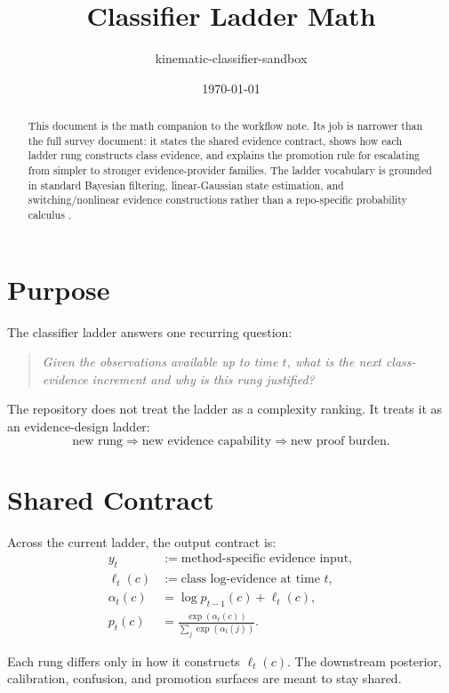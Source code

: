 \documentclass[11pt]{article}
\title{Classifier Ladder Math}
\author{kinematic-classifier-sandbox}
\date{\today}
\begin{document}
\maketitle

\begin{abstract}
This document is the math companion to the workflow note. Its job is narrower than the full survey document: it states the shared evidence contract, shows how each ladder rung constructs class evidence, and explains the promotion rule for escalating from simpler to stronger evidence-provider families. The ladder vocabulary is grounded in standard Bayesian filtering, linear-Gaussian state estimation, and switching/nonlinear evidence constructions rather than a repo-specific probability calculus \cite{kalman1960,barshalom2001,gordon1993,doucet2001}.
\end{abstract}

\section{Purpose}
The classifier ladder answers one recurring question:
\begin{quote}
\textit{Given the observations available up to time \(t\), what is the next class-evidence increment and why is this rung justified?}
\end{quote}

The repository does not treat the ladder as a complexity ranking. It treats it as an evidence-design ladder:
\begin{equation}
\text{new rung} \Longrightarrow \text{new evidence capability} \Longrightarrow \text{new proof burden}.
\end{equation}

\section{Shared Contract}
Across the current ladder, the output contract is:
\begin{align}
y_t &:= \text{method-specific evidence input}, \\
\ell_t(c) &:= \text{class log-evidence at time } t, \\
\alpha_t(c) &= \log p_{t-1}(c) + \ell_t(c), \\
p_t(c) &= \frac{\exp(\alpha_t(c))}{\sum_j \exp(\alpha_t(j))}.
\end{align}

Each rung differs only in how it constructs \(\ell_t(c)\). The downstream posterior, calibration, confusion, and promotion surfaces are meant to stay shared.
\end{document}
